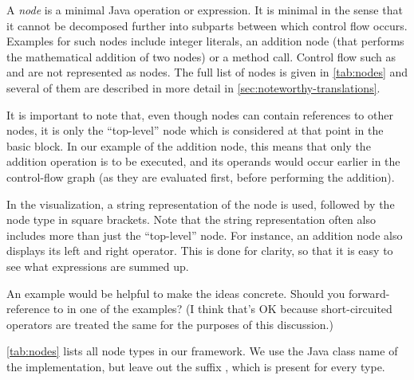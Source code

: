 \begin{definition}[Nodes]
    \label{def:node}
    A \emph{node} is a minimal Java operation or expression.
    It is minimal in the sense that it cannot be decomposed further into subparts
    between which control flow occurs. Examples for such nodes include integer literals,
    an addition node (that performs the mathematical addition of two nodes) or a method call.
    Control flow such as  and  are not represented as nodes.
    The full list of nodes is given in \autoref{tab:nodes} and several of them
    are described in more detail in \autoref{sec:noteworthy-translations}.
    
    It is important to note that, even though nodes can contain references to other nodes,
    it is only the ``top-level'' node which is considered at that point in the basic
    block. In our example of the addition node, this means that only the addition operation
    is to be executed, and its operands would occur earlier in the control-flow graph
    (as they are evaluated first, before performing the addition).
\end{definition}

In the visualization, a string representation of the node is used, followed by
the node type in square brackets. Note that the string representation often also includes
more than just the ``top-level'' node. For instance, an addition node also displays its
left and right operator. This is done for clarity, so that it is easy to see what
expressions are summed up.

\begin{workinprogress}
  An example would be helpful to make the ideas concrete.  Should you
  forward-reference to \code{||} in one of the examples?  (I think that's
  OK because short-circuited operators are treated the same for the
  purposes of this discussion.)
\end{workinprogress}

\autoref{tab:nodes} lists all node types in our framework. We use the
Java class name of the implementation, but leave out the suffix , which is present
for every type.

